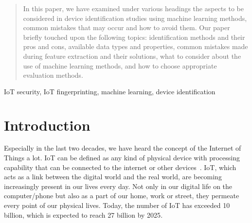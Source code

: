 \documentclass[journal]{IEEEtran}
\begin{document}







\maketitle

\begin{abstract}
In this paper, we have examined under various headings the aspects to be considered in device identification studies using machine learning methods, common mistakes that may occur and how to avoid them. Our paper briefly touched upon the following topics: identification methods and their pros and cons, available data types and properties, common mistakes made during feature extraction and their solutions, what to consider about the use of machine learning methods, and how to choose appropriate evaluation methods.
\end{abstract}

\begin{IEEEkeywords}
IoT security, IoT fingerprinting, machine learning, device identification
\end{IEEEkeywords}



\section{Introduction}


Especially in the last two decades, we have heard the concept of the Internet of Things a lot. IoT can be defined as any kind of physical device with processing capability that can be connected to the internet or other devices~\cite{IoT2023What}.  IoT, which acts as a link between the digital world and the real world, are becoming increasingly present in our lives every day. Not only in our digital life on the computer/phone but also as a part of our home, work or street, they permeate every point of our physical lives. Today, the number of IoT has exceeded 10 billion, which is expected to reach 27 billion by 2025\cite{IoT2023sta}. 
\end{document}
